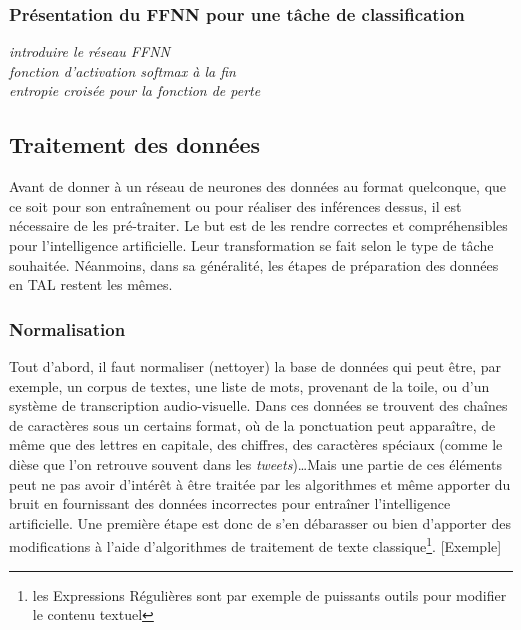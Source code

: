 \documentclass[12pt, french, twoside]{report}
\begin{document}
\subsubsection{Présentation du FFNN pour une tâche de classification}
\textit{introduire le réseau FFNN\\
    fonction d'activation softmax à la fin\\
    entropie croisée pour la fonction de perte\\
    }
\subsection{Traitement des données}

Avant de donner à un réseau de neurones des données au format quelconque, que ce soit pour son entraînement ou pour réaliser des inférences dessus, il est nécessaire de les pré-traiter. Le but est de les rendre correctes et compréhensibles pour l'intelligence artificielle. Leur transformation se fait selon le type de tâche souhaitée. Néanmoins, dans sa généralité, les étapes de préparation des données en TAL restent les mêmes.\\

\subsubsection{Normalisation}
Tout d'abord, il faut normaliser (nettoyer) la base de données qui peut être, par exemple, un corpus de textes, une liste de mots, provenant de la toile, ou d'un système de transcription audio-visuelle. Dans ces données se trouvent des chaînes de caractères sous un certains format, où de la ponctuation peut apparaître, de même que des lettres en capitale, des chiffres, des caractères spéciaux (comme le dièse que l'on retrouve souvent dans les \textit{tweets})\dots Mais une partie de ces éléments peut ne pas avoir d'intérêt à être traitée par les algorithmes et même apporter du bruit en fournissant des données incorrectes pour entraîner l'intelligence artificielle. Une première étape est donc de s'en débarasser ou bien d'apporter des modifications à l'aide d'algorithmes de traitement de texte classique\footnote{les Expressions Régulières sont par exemple de puissants outils pour modifier le contenu textuel}.\citep[chap.~2]{jurafsky} [Exemple]\\
\end{document}
